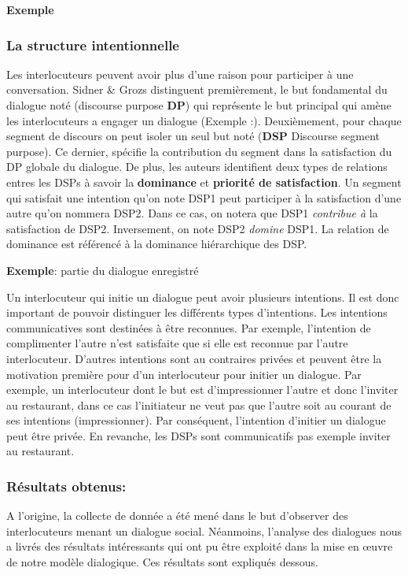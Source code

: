 \documentclass[a4paper,french]{article}
\begin{document}
\textbf{Exemple}

\subsubsection{La structure intentionnelle} 
Les interlocuteurs peuvent avoir plus d'une raison pour participer à une conversation. Sidner \& Grozs distinguent premièrement, le but fondamental du dialogue noté (discourse purpose \textbf{DP}) qui représente le but principal qui amène les interlocuteurs a engager un dialogue (Exemple :). Deuxièmement, pour chaque segment de discours on peut isoler un seul but noté (\textbf{DSP} Discourse segment purpose). Ce dernier, spécifie la contribution du segment dans la satisfaction du DP globale du dialogue. De plus, les auteurs identifient deux types de relations entres les DSPs à savoir la \textbf{dominance} et \textbf{priorité de satisfaction}. Un segment qui satisfait une intention qu'on note DSP1 peut participer à la satisfaction d'une autre qu'on nommera DSP2. Dans ce cas, on notera que DSP1 \textit{contribue à} la satisfaction de DSP2. Inversement, on note DSP2 \textit{domine} DSP1. La relation de dominance est référencé à la dominance hiérarchique des DSP.

\par \textbf{Exemple}: 
partie du dialogue enregistré


\par Un interlocuteur qui initie un dialogue peut avoir plusieurs intentions. Il est donc important de pouvoir distinguer les différents types d'intentions. Les intentions communicatives sont destinées à être reconnues. Par exemple, l'intention de complimenter l'autre n'est satisfaite que si elle est reconnue par l'autre interlocuteur. D'autres intentions sont au contraires privées et peuvent être la motivation première pour d'un interlocuteur pour initier un dialogue. Par exemple, un interlocuteur dont le but est d'impressionner l'autre et donc l'inviter au restaurant, dans ce cas l'initiateur ne veut pas que l'autre soit au courant de ses intentions (impressionner). Par conséquent, l'intention d'initier un dialogue peut être privée. En revanche, les DSPs sont communicatifs pas exemple inviter au restaurant. 

\subsubsection{Résultats obtenus:}
\par A l'origine, la collecte de donnée a été mené dans le but d'observer des interlocuteurs menant un dialogue social. Néanmoins, l'analyse des dialogues nous a livrés des résultats intéressants qui ont pu être exploité dans la mise en œuvre de notre modèle dialogique.  Ces résultats sont expliqués dessous.
\end{document}
